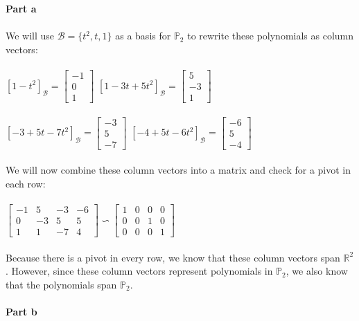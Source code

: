 \documentclass{article}%
\begin{document}
\medium \textbf{Part a}\\
\\
We will use $\mathcal{B} = \{t^2, t, 1\}$ as a basis for $\mathbb{P}_2$ to rewrite these polynomials as column vectors:\\
\\
$[1-t^2]_\mathcal{B} =
\begin{bmatrix}
    -1 \\ 0 \\ 1
\end{bmatrix}$
\hfill
$[1-3t+5t^2]_\mathcal{B} =
\begin{bmatrix}
    5 \\ -3 \\ 1
\end{bmatrix}$\\
\\
$[-3+5t-7t^2]_\mathcal{B} =
\begin{bmatrix}
    -3 \\ 5 \\ -7
\end{bmatrix}$
\hfill
$[-4+5t-6t^2]_\mathcal{B} =
\begin{bmatrix}
    -6 \\ 5 \\ -4
\end{bmatrix}$\\
\\[0.05in]
We will now combine these column vectors into a matrix and check for a pivot in each row:\\
\\
$
\begin{bmatrix}
    -1 & 5 & -3 & -6 \\
    0 & -3 & 5 & 5 \\
    1 & 1 & -7 & 4
\end{bmatrix}
\backsim
\begin{bmatrix}
    1 & 0 & 0 & 0 \\
    0 & 0 & 1 & 0 \\
    0 & 0 & 0 & 1
\end{bmatrix}$\\
\\
Because there is a pivot in every row, we know that these column vectors span $\mathbb{R}^2$. However, since these column vectors
represent polynomials in $\mathbb{P}_2$, we also know that the polynomials span $\mathbb{P}_2$.\\
\\[0.1in]
\medium \textbf{Part b}\\
\end{document}
